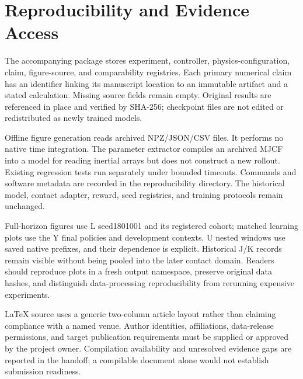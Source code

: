 \section{Reproducibility and Evidence Access}
The accompanying package stores experiment, controller, physics-configuration, claim, figure-source, and comparability registries. Each primary numerical claim has an identifier linking its manuscript location to an immutable artifact and a stated calculation. Missing source fields remain empty. Original results are referenced in place and verified by SHA-256; checkpoint files are not edited or redistributed as newly trained models.

Offline figure generation reads archived NPZ/JSON/CSV files. It performs no native time integration. The parameter extractor compiles an archived MJCF into a model for reading inertial arrays but does not construct a new rollout. Existing regression tests run separately under bounded timeouts. Commands and software metadata are recorded in the reproducibility directory. The historical model, contact adapter, reward, seed registries, and training protocols remain unchanged.

Full-horizon figures use L seed1801001 and its registered cohort; matched learning plots use the Y final policies and development contexts. U nested windows use saved native prefixes, and their dependence is explicit. Historical J/K records remain visible without being pooled into the later contact domain. Readers should reproduce plots in a fresh output namespace, preserve original data hashes, and distinguish data-processing reproducibility from rerunning expensive experiments.

LaTeX source uses a generic two-column article layout rather than claiming compliance with a named venue. Author identities, affiliations, data-release permissions, and target publication requirements must be supplied or approved by the project owner. Compilation availability and unresolved evidence gaps are reported in the handoff; a compilable document alone would not establish submission readiness.
